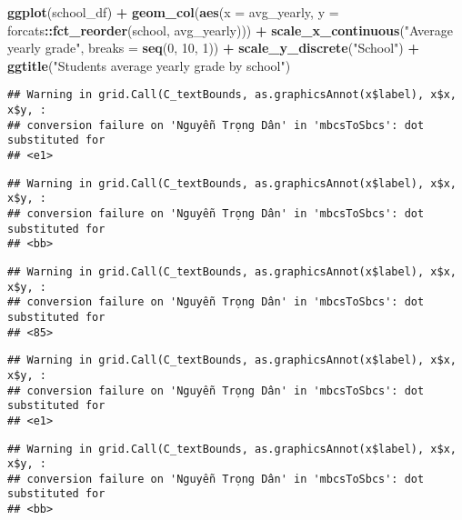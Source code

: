 \documentclass[
]{article}
\newenvironment{Shaded}{\begin{snugshade}}{\end{snugshade}}
\newcommand{\AttributeTok}[1]{\textcolor[rgb]{0.13,0.29,0.53}{#1}}
\newcommand{\DecValTok}[1]{\textcolor[rgb]{0.00,0.00,0.81}{#1}}
\newcommand{\FunctionTok}[1]{\textcolor[rgb]{0.13,0.29,0.53}{\textbf{#1}}}
\newcommand{\NormalTok}[1]{#1}
\newcommand{\SpecialCharTok}[1]{\textcolor[rgb]{0.81,0.36,0.00}{\textbf{#1}}}
\newcommand{\StringTok}[1]{\textcolor[rgb]{0.31,0.60,0.02}{#1}}
\begin{document}
\begin{Shaded}
\begin{Highlighting}[]
\FunctionTok{ggplot}\NormalTok{(school\_df) }\SpecialCharTok{+} 
  \FunctionTok{geom\_col}\NormalTok{(}\FunctionTok{aes}\NormalTok{(}\AttributeTok{x =}\NormalTok{ avg\_yearly, }\AttributeTok{y =}\NormalTok{ forcats}\SpecialCharTok{::}\FunctionTok{fct\_reorder}\NormalTok{(school, avg\_yearly))) }\SpecialCharTok{+}
  \FunctionTok{scale\_x\_continuous}\NormalTok{(}\StringTok{"Average yearly grade"}\NormalTok{, }\AttributeTok{breaks =} \FunctionTok{seq}\NormalTok{(}\DecValTok{0}\NormalTok{, }\DecValTok{10}\NormalTok{, }\DecValTok{1}\NormalTok{)) }\SpecialCharTok{+}
  \FunctionTok{scale\_y\_discrete}\NormalTok{(}\StringTok{"School"}\NormalTok{) }\SpecialCharTok{+}
  \FunctionTok{ggtitle}\NormalTok{(}\StringTok{"Student\textquotesingle{}s average yearly grade by school"}\NormalTok{)}
\end{Highlighting}
\end{Shaded}

\begin{verbatim}
## Warning in grid.Call(C_textBounds, as.graphicsAnnot(x$label), x$x, x$y, :
## conversion failure on 'Nguyễn Trọng Dân' in 'mbcsToSbcs': dot substituted for
## <e1>
\end{verbatim}

\begin{verbatim}
## Warning in grid.Call(C_textBounds, as.graphicsAnnot(x$label), x$x, x$y, :
## conversion failure on 'Nguyễn Trọng Dân' in 'mbcsToSbcs': dot substituted for
## <bb>
\end{verbatim}

\begin{verbatim}
## Warning in grid.Call(C_textBounds, as.graphicsAnnot(x$label), x$x, x$y, :
## conversion failure on 'Nguyễn Trọng Dân' in 'mbcsToSbcs': dot substituted for
## <85>
\end{verbatim}

\begin{verbatim}
## Warning in grid.Call(C_textBounds, as.graphicsAnnot(x$label), x$x, x$y, :
## conversion failure on 'Nguyễn Trọng Dân' in 'mbcsToSbcs': dot substituted for
## <e1>
\end{verbatim}

\begin{verbatim}
## Warning in grid.Call(C_textBounds, as.graphicsAnnot(x$label), x$x, x$y, :
## conversion failure on 'Nguyễn Trọng Dân' in 'mbcsToSbcs': dot substituted for
## <bb>
\end{verbatim}
\end{document}
